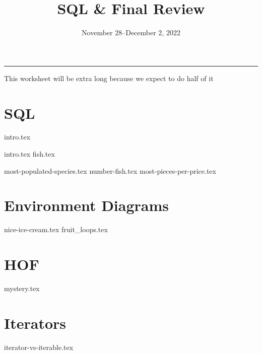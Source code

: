 \documentclass{exam}
\title{SQL \& Final Review}
\date{November 28--December 2, 2022}
\begin{document}
\maketitle\rule{\textwidth}{0.15em}

\begin{guide}
    This worksheet will be extra long because we expect to do half of it 
\end{guide}


\section{SQL}
{intro.tex}

{intro.tex}
{fish.tex}
\begin{questions}
  {most-populated-species.tex}
  {number-fish.tex}
  {most-pieces-per-price.tex}
\end{questions}


\section{Environment Diagrams}
\begin{questions}
{nice-ice-cream.tex}
{fruit_loops.tex}
\end{questions}

\section{HOF}
\begin{questions}
{mystery.tex}
\end{questions}

\section{Iterators}
\begin{questions}
{iterator-vs-iterable.tex}
\end{questions}
\end{document}
